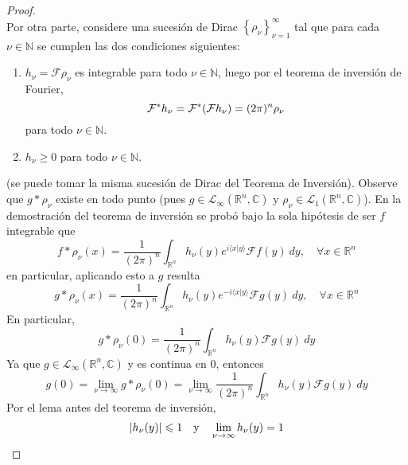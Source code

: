 \documentclass[12pt]{report}
\newcounter{it}
\theoremstyle{largebreak}
\renewcommand{\leq}{\ensuremath{\leqslant}}
\renewcommand{\geq}{\ensuremath{\geqslant}}
\newcommand\abs[1]{\ensuremath{\left|#1\right|}}
\newcommand\pint[2]{\ensuremath{\langle#1| #2\rangle}}
\newcommand{\fou}[1]{\ensuremath{\mathcal{F}#1}}
\begin{document}
\begin{proof}
\begin{equation*}
        \end{equation*}
        Por otra parte, considere una sucesión de Dirac $\left\{\rho_\nu\right\}_{\nu=1}^\infty$ tal que para cada $\nu\in\mathbb{N}$ se cumplen las dos condiciones siguientes:
        \begin{enumerate}
            \item $h_\nu=\fou{\rho_\nu}$ es integrable para todo $\nu\in\mathbb{N}$, luego por el teorema de inversión de Fourier,
            \begin{equation*}
                \fou^*{h_\nu}=\fou^*{(\fou{h_\nu})}=(2\pi)^n\rho_\nu
            \end{equation*}
            para todo $\nu\in\mathbb{N}$.
            \item $h_\nu\geq0$ para todo $\nu\in\mathbb{N}$.
        \end{enumerate}
        (se puede tomar la misma sucesión de Dirac del Teorema de Inversión). Observe que $g*\rho_\nu$ existe en todo punto (pues $g\in\mathcal{L}_{\infty}(\mathbb{R}^n,\mathbb{C})$ y $\rho_\nu\in\mathcal{L}_{1}(\mathbb{R}^n,\mathbb{C})$). En la demostración del teorema de inversión se probó bajo la sola hipótesis de ser $f$ integrable que
        \begin{equation*}
            f*\rho_\nu(x)=\frac{1}{(2\pi)^n}\int_{\mathbb{R}^n}h_\nu(y)e^{ i\pint{x}{y}}\fou{f}(y)\:dy,\quad\forall x\in\mathbb{R}^n
        \end{equation*}
        en particular, aplicando esto a $g$ resulta
        \begin{equation*}
            g*\rho_\nu(x)=\frac{1}{(2\pi)^n}\int_{\mathbb{R}^n}h_\nu(y)e^{ -i\pint{x}{y}}\fou{g}(y)\:dy,\quad\forall x\in\mathbb{R}^n
        \end{equation*}
        En particular,
        \begin{equation*}
            g*\rho_\nu(0)=\frac{1}{(2\pi)^n}\int_{\mathbb{R}^n}h_\nu(y)\fou{g}(y)\:dy
        \end{equation*}
        Ya que $g\in\mathcal{L}_{\infty}(\mathbb{R}^n,\mathbb{C})$ y es continua en 0, entonces
        \begin{equation*}
            g(0)=\lim_{\nu\rightarrow\infty}g*\rho_\nu(0)=\lim_{\nu\rightarrow\infty}\frac{1}{(2\pi)^n}\int_{\mathbb{R}^n}h_\nu(y)\fou{g}(y)\:dy
        \end{equation*}
        Por el lema antes del teorema de inversión,
        \begin{equation*}
            \abs{h_\nu(y)}\leq 1\quad\textup{y}\quad\lim_{\nu\rightarrow\infty}h_\nu(y)=1

\end{equation*}
\end{proof}
\end{document}
